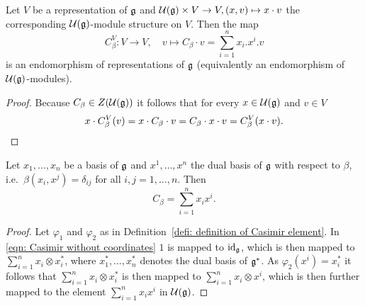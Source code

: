 \begin{cor}\label{cor: Casimir homomorphism of a representation}
 Let $V$ be a representation of $\mathfrak{g}$ and $\mathcal{U}(\mathfrak{g}) \times V \to V, (x,v) \mapsto x \cdot v$ the corresponding $\mathcal{U}(\mathfrak{g})$-module structure on $V$. Then the map
 \[
  C_\beta^V \colon V \to V, \quad v \mapsto C_\beta \cdot v = \sum_{i=1}^n x_i.x^i.v
 \]
 is an endomorphism of representations of $\mathfrak{g}$ (equivalently an endomorphism of $\mathcal{U}(\mathfrak{g})$-modules).
\end{cor}
\begin{proof}
 Because $C_\beta \in Z(\mathcal{U}(\mathfrak{g}))$ it follows that for every $x \in \mathcal{U}(\mathfrak{g})$ and $v \in V$
 \[
  x \cdot C_\beta^V(v)
  = x \cdot C_\beta \cdot v
  = C_\beta \cdot x \cdot v
  = C_\beta^V(x \cdot v).
  \qedhere
 \]
\end{proof}


\begin{lem} \label{lem: casimir in coordinates}
 Let $x_1, \dotsc, x_n$ be a basis of $\mathfrak{g}$ and $x^1, \dotsc, x^n$ the dual basis of $\mathfrak{g}$ with respect to $\beta$, i.e.\ $\beta(x_i, x^j) = \delta_{ij}$ for all $i,j = 1, \dotsc, n$. Then
 \[
  C_\beta = \sum_{i=1}^n x_i x^i.
 \]
\end{lem}
\begin{proof}
 Let $\varphi_1$ and $\varphi_2$ as in Definition~\ref{defi: definition of Casimir element}. In \eqref{eqn: Casimir without coordinates} $1$ is mapped to $\operatorname{id}_{\mathfrak{g}}$, which is then mapped to $\sum_{i=1}^n x_i \otimes x_i^*$, where $x_1^*, \dotsc, x_n^*$ denotes the dual basis of $\mathfrak{g}^*$. As $\varphi_2(x^i) = x_i^*$ it follows that $\sum_{i=1}^n x_i \otimes x_i^*$ is then mapped to $\sum_{i=1}^n x_i \otimes x^i$, which is then further mapped to the element $\sum_{i=1}^n x_i x^i$ in $\mathcal{U}(\mathfrak{g})$.
\end{proof}


